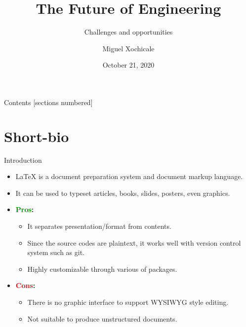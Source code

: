 \documentclass[xcolor={dvipsnames},aspectratio=169,10pt]{beamer}
\title{The Future of Engineering}
\subtitle{Challenges and opportunities }
\author{Miguel Xochicale}
\date{October 21, 2020}
\begin{document}
\maketitle%

\begin{frame}{Contents}
  [sections numbered]
  \tableofcontents[hideallsubsections]
\end{frame}


\section{Short-bio}

\begin{frame}{Introduction}
  \begin{itemize}
    \item \alert{\LaTeX{}} is a document preparation system and document markup language.
    \item It can be used to typeset articles, books, slides, posters, even graphics.
    \item \textbf{\textcolor{Green}{Pros}:}
          \begin{itemize}
            \item It separates presentation/format from contents.
            \item Since the source codes are plaintext, it works well with version control system such as git.
            \item Highly customizable through various of packages.
          \end{itemize}
    \item \textbf{\textcolor{Red}{Cons}:}
          \begin{itemize}
            \item There is no graphic interface to support WYSIWYG style editing.
            \item Not suitable to produce unstructured documents.
          \end{itemize}
  \end{itemize}
\end{frame}
\end{document}
